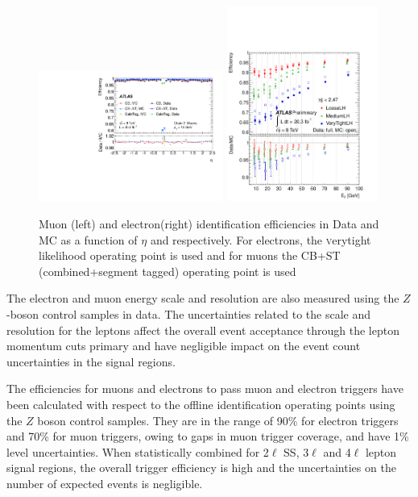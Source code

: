 \begin{figure}[htbp]
\begin{center}
\includegraphics[width=0.54\textwidth]{figs/systematics/fig_18a}
\includegraphics[width=0.44\textwidth]{figs/systematics/fig_22a}
\caption{Muon (left) and electron(right) identification efficiencies in Data and MC as a function of $\eta$ and \pt respectively. For electrons, the {\textsc verytight} likelihood operating point is used and for muons the CB+ST (combined+segment tagged) operating point is used}
\label{figure:systematics_lepidsf}
\end{center}
\end{figure}

The electron\cite{EgammaReco} and muon\cite{MuonSF} energy scale and resolution are also measured using the $Z$-boson control samples in data. The uncertainties related to the scale and resolution for the leptons affect the overall event acceptance through the lepton momentum cuts primary and have negligible impact on the event count uncertainties in the signal regions.

The efficiencies for muons and electrons to pass muon\cite{ATLAS-CONF-2012-099} and electron triggers\cite{ATLAS-CONF-2012-048} have been calculated with respect to the offline identification operating points using the $Z$ boson control samples. They are in the range of 90\% for electron triggers and 70\% for muon triggers, owing to gaps in muon trigger coverage, and have 1\% level uncertainties. When statistically combined for 2$\ell$ SS, 3$\ell$ and 4$\ell$ lepton signal regions, the overall trigger efficiency is high and the uncertainties on the number of expected events is negligible. 



